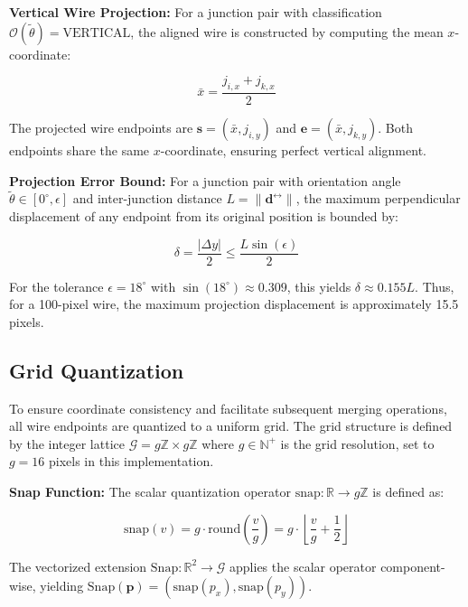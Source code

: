 \textbf{Vertical Wire Projection:} For a junction pair with classification $\mathcal{O}(\tilde{\theta}) = \text{VERTICAL}$, the aligned wire is constructed by computing the mean $x$-coordinate:

\begin{equation}
\bar{x} = \frac{j_{i,x} + j_{k,x}}{2}
\label{eq:vertical-projection}
\end{equation}

The projected wire endpoints are $\mathbf{s} = (\bar{x}, j_{i,y})$ and $\mathbf{e} = (\bar{x}, j_{k,y})$. Both endpoints share the same $x$-coordinate, ensuring perfect vertical alignment.

\textbf{Projection Error Bound:} For a junction pair with orientation angle $\tilde{\theta} \in [0^\circ, \epsilon]$ and inter-junction distance $L = \|\mathbf{d}^{\leftrightarrow}\|$, the maximum perpendicular displacement of any endpoint from its original position is bounded by:

\begin{equation}
\delta = \frac{|\Delta y|}{2} \le \frac{L \sin(\epsilon)}{2}
\label{eq:projection-error}
\end{equation}

For the tolerance $\epsilon = 18^\circ$ with $\sin(18^\circ) \approx 0.309$, this yields $\delta \approx 0.155L$. Thus, for a 100-pixel wire, the maximum projection displacement is approximately 15.5 pixels.

\subsection{Grid Quantization}

To ensure coordinate consistency and facilitate subsequent merging operations, all wire endpoints are quantized to a uniform grid. The grid structure is defined by the integer lattice $\mathcal{G} = g\mathbb{Z} \times g\mathbb{Z}$ where $g \in \mathbb{N}^+$ is the grid resolution, set to $g = 16$ pixels in this implementation.

\textbf{Snap Function:} The scalar quantization operator $\text{snap} : \mathbb{R} \to g\mathbb{Z}$ is defined as:

\begin{equation}
\text{snap}(v) = g \cdot \text{round}\left(\frac{v}{g}\right) = g \cdot \left\lfloor \frac{v}{g} + \frac{1}{2} \right\rfloor
\label{eq:snap-function}
\end{equation}

The vectorized extension $\text{Snap} : \mathbb{R}^2 \to \mathcal{G}$ applies the scalar operator component-wise, yielding $\text{Snap}(\mathbf{p}) = (\text{snap}(p_x), \text{snap}(p_y))$.

